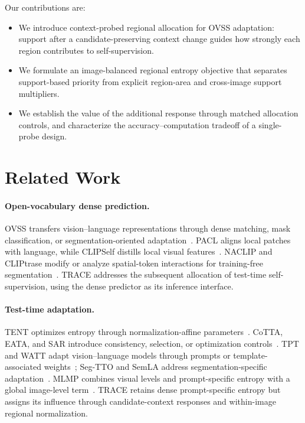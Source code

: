 \documentclass[letterpaper]{article}
\begin{document}
Our contributions are:
\begin{itemize}
\item We introduce context-probed regional allocation for OVSS adaptation: support after a candidate-preserving context change guides how strongly each region contributes to self-supervision.
\item We formulate an image-balanced regional entropy objective that separates support-based priority from explicit region-area and cross-image support multipliers.
\item We establish the value of the additional response through matched allocation controls, and characterize the accuracy--computation tradeoff of a single-probe design.
\end{itemize}

\section{Related Work}
\paragraph{Open-vocabulary dense prediction.}
OVSS transfers vision--language representations through dense matching, mask classification, or segmentation-oriented adaptation~\cite{ghiasi2022openseg,liang2023ovseg,cho2024catseg}. PACL aligns local patches with language, while CLIPSelf distills local visual features~\cite{mukhoti2023pacl,wu2024clipself}. NACLIP and CLIPtrase modify or analyze spatial-token interactions for training-free segmentation~\cite{hajimiri2025naclip,shao2024cliptrase}. TRACE addresses the subsequent allocation of test-time self-supervision, using the dense predictor as its inference interface.

\paragraph{Test-time adaptation.}
TENT optimizes entropy through normalization-affine parameters~\cite{wang2021tent}. CoTTA, EATA, and SAR introduce consistency, selection, or optimization controls~\cite{wang2022cotta,niu2022eata,niu2023sar}. TPT and WATT adapt vision--language models through prompts or template-associated weights~\cite{shu2022tpt,osowiechi2024watt}; Seg-TTO and SemLA address segmentation-specific adaptation~\cite{desilva2025segtto,qorbani2025semla}. MLMP combines visual levels and prompt-specific entropy with a global image-level term~\cite{noori2025mlmp}. TRACE retains dense prompt-specific entropy but assigns its influence through candidate-context responses and within-image regional normalization.
\end{document}
